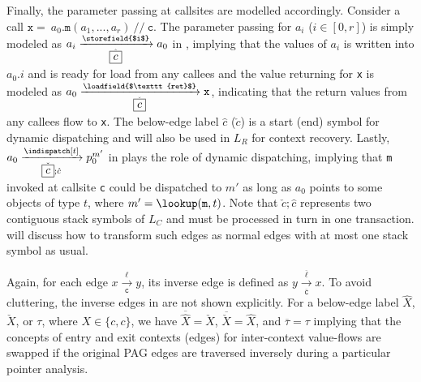 Finally, the parameter passing at callsites are modelled accordingly. Consider a call $\mathtt{x = } ~ a_0.\mathtt{m}(a_1,..., a_r) ~ \mathtt{//~ c}$. 
The parameter passing for $a_i$ ($i \in [0, r]$) is simply modeled as $a_i \xrightarrow[\hat{\boxed{c}}]{\storefield{$i$}} a_0$ in , implying that the values of $a_i$ is written into $a_0.i$ and is ready for load from any callees and the value returning for \texttt{x} is modeled as $a_0 \xrightarrow[\check{\boxed{c}}]{\loadfield{$\texttt{ret}$}} \mathtt{x}$, indicating that the return values from any callees flow to \texttt{x}. The below-edge label $\hat{\boxed{c}}$ ($\check{\boxed{c}}$) is a start (end) symbol for dynamic dispatching and will also be used in $L_R$ for context recovery. Lastly, $a_0 \xrightarrow[\check{\boxed{c}};\hat{c}]{\indispatch[t]} p_0^{m'}$ in  plays the role of dynamic dispatching, implying that \texttt{m} invoked at callsite \texttt{c} could be dispatched to $m'$ as long as $a_0$ points to some objects of type $t$, where $m' = \lookup(\texttt{m}, t)$. Note that $\check{\boxed{c}};\hat{c}$ represents two contiguous stack symbols of $L_C$ and must be processed in turn in one transaction.  will discuss how to transform such edges as normal edges with at most one stack symbol as usual.


Again, for each \pag edge 
$x\xrightarrow[\mathtt{c}]{\ell}y$, its inverse edge is defined as  
$y\xrightarrow[\overline{\mathtt{c}}]{\overline{\ell}}x$. 
To avoid cluttering, the inverse \pag edges in  are not
shown explicitly. For a below-edge label $\hat{X}$, $\check{X}$, or $\tau$, where $X\in \{c,\boxed{c}\}$, we have
$\overline{\hat{X}}=\check{X}$, $\overline{\check{X}}=\hat{X}$, and $\overline{\tau}=\tau$ implying that the concepts
of entry and exit contexts (edges) for inter-context
value-flows are swapped if the original PAG
edges are traversed inversely during a particular pointer analysis. 


